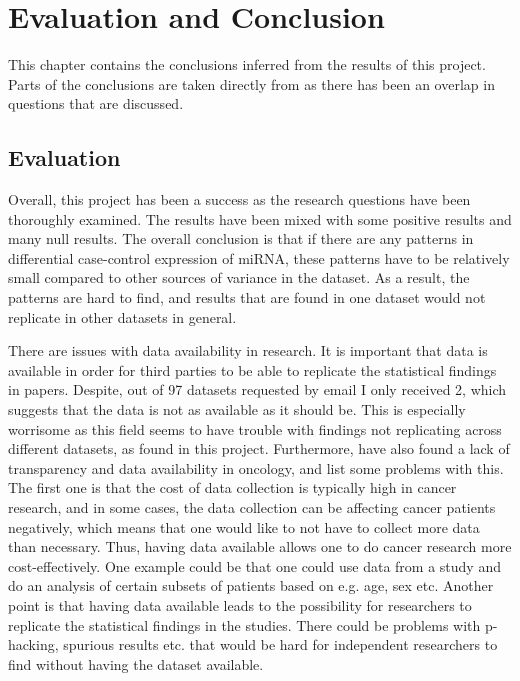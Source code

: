 \chapter{Evaluation and Conclusion}
\label{cha:evaluationAndConclusion}

This chapter contains the conclusions inferred from the results of this project. Parts of the conclusions are taken directly from \citet{forprosjekt} as there has been an overlap in questions that are discussed.

\section{Evaluation}
\label{sec:evaluation}

Overall, this project has been a success as the research questions have been thoroughly examined. The results have been mixed with some positive results and many null results. The overall conclusion is that if there are any patterns in differential case-control expression of miRNA, these patterns have to be relatively small compared to other sources of variance in the dataset. As a result, the patterns are hard to find, and results that are found in one dataset would not replicate in other datasets in general.

There are issues with data availability in research. It is important that data is available in order for third parties to be able to replicate the statistical findings in papers. Despite, out of 97 datasets requested by email I only received 2, which suggests that the data is not as available as it should be. This is especially worrisome as this field seems to have trouble with findings not replicating across different datasets, as found in this project. Furthermore, \citet{oncology_reproducability} have also found a lack of transparency and data availability in oncology, and list some problems with this.
The first one is that the cost of data collection is typically high in cancer research, and in some cases, the data collection can be affecting cancer patients negatively, which means that one would like to not have to collect more data than necessary.
Thus, having data available allows one to do cancer research more cost-effectively. One example could be that one could use data from a study and do an analysis of certain subsets of patients based on e.g. age, sex etc.
Another point is that having data available leads to the possibility for researchers to replicate the statistical findings in the studies.
There could be problems with p-hacking, spurious results etc. that would be hard for independent researchers to find without having the dataset available.

